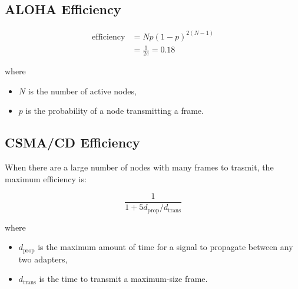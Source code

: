 \subsection{ALOHA Efficiency}

\begin{align*}
    \text{efficiency} & = Np(1-p)^{2(N-1)}                             \\
                      & = \frac{1}{2e} = 0.18 \tag{maximum efficiency}
\end{align*}

where
\begin{itemize}
    \item $N$ is the number of active nodes,
    \item $p$ is the probability of a node transmitting a frame.
\end{itemize}

\subsection{CSMA/CD Efficiency}

When there are a large number of nodes with many frames to trasmit, the maximum efficiency is:

\begin{equation*}
    \frac{1}{1 + 5d_\text{prop}/d_\text{trans}}
\end{equation*}

where
\begin{itemize}
    \item $d_\text{prop}$ is the maximum amount of time for a signal to propagate between any two adapters,
    \item $d_\text{trans}$ is the time to transmit a maximum-size frame.
\end{itemize}
